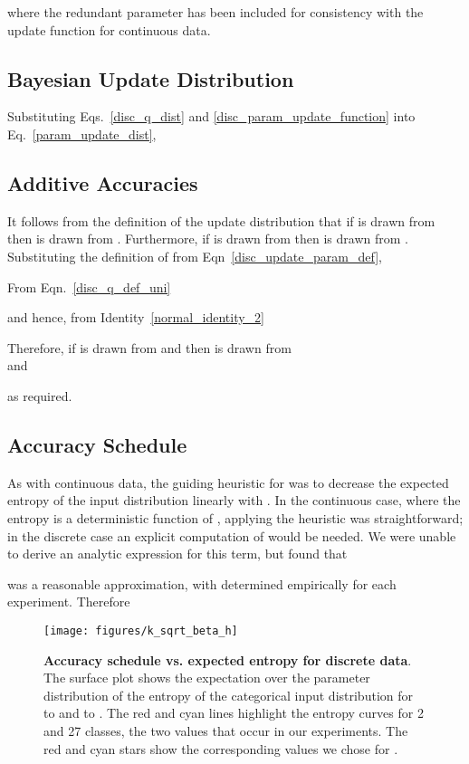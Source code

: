 \documentclass[11pt,table]{article}
\newcommand{\0}[1]{\constvec{0}{#1}}
\newcommand{\1}[1]{\constvec{1}{#1}}
\begin{document}
where the redundant parameter  has been included for consistency with the update function for continuous data.
\subsection{Bayesian Update Distribution \texorpdfstring{}{}}
Substituting Eqs.~\ref{disc_q_dist} and \ref{disc_param_update_function} into Eq.~\ref{param_update_dist},

\subsection{Additive Accuracies}\label{sec:disc_additive}
It follows from the definition of the update distribution that if  is drawn from  then  is drawn from .
Furthermore, if  is drawn from  then  is drawn from .
Substituting the definition of  from Eqn~\ref{disc_update_param_def},

From Eqn.~\ref{disc_q_def_uni}

and hence, from Identity~\ref{normal_identity_2}

Therefore, if  is drawn from  and  then  is drawn from\\  and

as required. 
\subsection{Accuracy Schedule \texorpdfstring{}{}}\label{sec:disc_beta}
As with continuous data, the guiding heuristic for  was to decrease the expected entropy of the input distribution linearly with . In the continuous case, where the entropy is a deterministic function of , applying the heuristic was straightforward; in the discrete case an explicit computation of  would be needed.
We were unable to derive an analytic expression for this term, but found that

was a reasonable approximation, with  determined empirically for each experiment.
Therefore


\begin{figure}[t!]
\begin{centering}
\texttt{[image: figures/k\_sqrt\_beta\_h]}
\caption{\textbf{Accuracy schedule vs. expected entropy for discrete data}. The surface plot shows the expectation over the parameter distribution  of the entropy of the categorical input distribution  for  to  and  to . The red and cyan lines highlight the entropy curves for 2 and 27 classes, the two values that occur in our experiments. The red and cyan stars show the corresponding values we chose for .}
\end{centering}
\label{fig:disc_acc_vs_entropy}
\end{figure}
\end{document}

